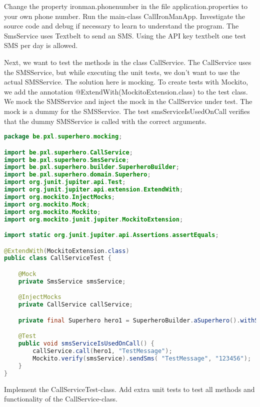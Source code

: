 \begin{oefening}
Change the property ironman.phonenumber in the file application.properties to your own phone number.
Run the main-class CallIronManApp. Investigate the source code and debug if necessary to learn to understand the program.
The SmsService uses Textbelt to send an SMS.  Using the API key textbelt one test SMS per day is allowed.
\end{oefening}

Next, we want to test the methods in the class CallService.  The CallService uses the SMSService, but while executing the unit tests, we don't want to use the actual SMSService. The solution here is mocking. 
To create tests with Mockito, we add the annotation @ExtendWith(MockitoExtension.class) to the test class.
We mock the SMSService and inject the mock in the CallService under test. The mock is a dummy for the SMSService.
The test smsServiceIsUsedOnCall verifies that the dummy SMSService is called with the correct arguments.


\begin{lstlisting}[frame=single, language=java]
package be.pxl.superhero.mocking;

import be.pxl.superhero.CallService;
import be.pxl.superhero.SmsService;
import be.pxl.superhero.builder.SuperheroBuilder;
import be.pxl.superhero.domain.Superhero;
import org.junit.jupiter.api.Test;
import org.junit.jupiter.api.extension.ExtendWith;
import org.mockito.InjectMocks;
import org.mockito.Mock;
import org.mockito.Mockito;
import org.mockito.junit.jupiter.MockitoExtension;

import static org.junit.jupiter.api.Assertions.assertEquals;

@ExtendWith(MockitoExtension.class)
public class CallServiceTest {

	@Mock
	private SmsService smsService;

	@InjectMocks
	private CallService callService;

	private final Superhero hero1 = SuperheroBuilder.aSuperhero().withSuperheroName("Hero 1").withPhoneNumber("123456").build();

	@Test
	public void smsServiceIsUsedOnCall() {
		callService.call(hero1, "TestMessage");
		Mockito.verify(smsService).sendSms( "TestMessage", "123456");
	}
}
\end{lstlisting}

\begin{oefening}
Implement the CallServiceTest-class.  Add extra unit tests to test all methods and functionality of the CallService-class.
\end{oefening}


